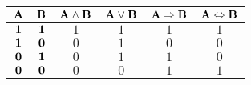 \documentclass[main.tex]{subfiles}
\begin{document}
\begin{tabular}{cc|cccc}
    $\mathbf{A}$	&	$\mathbf{B}$	&	$\mathbf{A \wedge B}$	&	$\mathbf{A \vee B}$	&	$\mathbf{A \Rightarrow B}$	&	$\mathbf{A \Leftrightarrow B}$	\\\hline
    $\mathbf{1}$	&	$\mathbf{1}$	&	$1$									&	$1$								&	$1$											&	$1$													\\
    $\mathbf{1}$	&	$\mathbf{0}$	&	$0$									&	$1$								&	$0$											&	$0$													\\
    $\mathbf{0}$	&	$\mathbf{1}$	&	$0$									&	$1$								&	$1$											&	$0$													\\
    $\mathbf{0}$	&	$\mathbf{0}$	&	$0$									&	$0$								&	$1$											&	$1$													\\
  \end{tabular}
\end{document}
